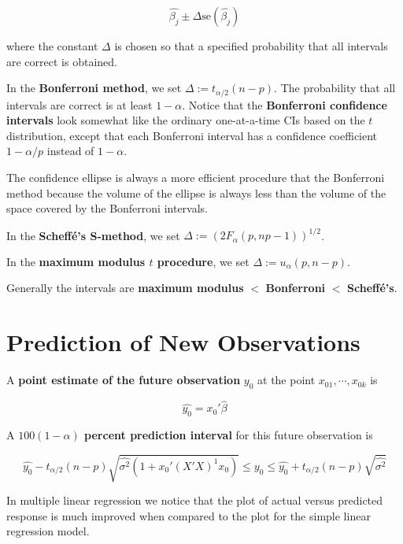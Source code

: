 \documentclass[12pt]{article}
\begin{document}
$$
\hat{\beta_j} \pm \Delta \mathrm{se} (\hat{\beta_j})
$$

where the constant $\Delta$ is chosen so that a specified probability that all intervals are correct is obtained. 


\bigskip
In the \textbf{Bonferroni method}, we set $\Delta := t_{\alpha/2} (n-p) $. The probability that all intervals are correct is at least $1 - \alpha$. Notice that the \textbf{Bonferroni confidence intervals} look somewhat like the ordinary one-at-a-time CIs based on the $t$ distribution, except that each Bonferroni interval has a confidence coefficient $1 - \alpha/p$ instead of $1 - \alpha$. 

The confidence ellipse is always a more efficient procedure that the Bonferroni method because the volume of the ellipse is always less than the volume of the space covered by the Bonferroni intervals. 

\bigskip
In the \textbf{Scheffé's S-method}, we set $\Delta := (2F_\alpha (p, np-1))^{1/2}$. 


\bigskip
In the \textbf{maximum modulus $t$ procedure}, we set $\Delta := u_\alpha (p, n-p)$. 

\bigskip
Generally the intervals are \textbf{maximum modulus} $<$ \textbf{Bonferroni} $<$  \textbf{Scheffé's}. 


\section{Prediction of New Observations}

A \textbf{point estimate of the future observation} $y_0$ at the point $x_{01}, \cdots, x_{0k}$ is 

$$
\hat{y_0} = x_0' \hat{\beta}
$$


A \textbf{$100(1 - \alpha)$ percent prediction interval} for this future observation is 

$$
\hat{y_0} - t_{\alpha/2}(n-p) \sqrt{ \hat{\sigma^2} (1 + x_0' (X'X)^{1} x_0) } \le y_0 \le \hat{y_0} + t_{\alpha/2}(n-p) \sqrt{ \hat{\sigma^2}}
$$



In multiple linear regression we notice that the plot of actual versus predicted response is much improved when compared to the plot for the simple linear regression model. 
\end{document}
